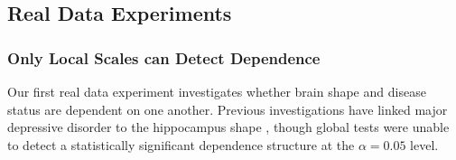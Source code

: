 \documentclass[11pt]{article}
\providecommand{\sct}[1]{{\normalfont\textsc{#1}}}
\newcommand{\subfigimg}[3][,]{%
  \setbox1=\hbox{\texttt{[image: \#3]}}%
  \leavevmode\rlap{\usebox1}%
  \rlap{\hspace*{12pt}\raisebox{\dimexpr\ht1-0\baselineskip}{#2}}%
  \phantom{\usebox1}%
}
\newcommand{\Mgc}{\sct{Mgc}}
\newcommand{\Mcorr}{\sct{Mcorr}}
\begin{document}

\subsection*{Real Data Experiments}
\label{numer3}

\subsubsection*{Only Local Scales can Detect Dependence} %

Our first real data experiment investigates whether brain shape and disease status are  dependent on one another.  Previous investigations have linked major depressive disorder to the hippocampus shape \cite{ParkEtAl2008,PosenerEtAl2003}, though global tests were unable to detect a statistically significant dependence structure at the $\alpha=0.05$ level.
\end{document}
